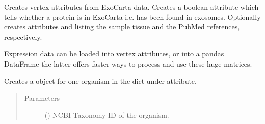 \documentclass[letterpaper,10pt,english]{sphinxmanual}
\begin{document}
\begin{fulllineitems}

\begin{fulllineitems}
\label{\detokenize{reference:pypath.main.PyPath.load_elm}}
\end{fulllineitems}


\begin{fulllineitems}
\label{\detokenize{reference:pypath.main.PyPath.load_exocarta_attrs}}
Creates vertex attributes from ExoCarta data. Creates a boolean
attribute  which tells whether a protein is
in ExoCarta i.e. has been found in exosomes. Optionally creates
attributes  and  listing the
sample tissue and the PubMed references, respectively.

\end{fulllineitems}


\begin{fulllineitems}
\label{\detokenize{reference:pypath.main.PyPath.load_expression}}
Expression data can be loaded into vertex attributes,
or into a pandas DataFrame \textendash{} the latter offers faster
ways to process and use these huge matrices.

\end{fulllineitems}


\begin{fulllineitems}
\label{\detokenize{reference:pypath.main.PyPath.load_go}}
Creates a  object for one organism in the
dict under  attribute.
\begin{quote}\begin{description}
\item[{Parameters}] \leavevmode
{} () \textendash{} NCBI Taxonomy ID of the organism.


\end{description}
\end{quote}
\end{fulllineitems}
\end{fulllineitems}
\end{document}
